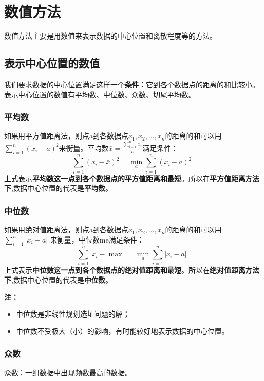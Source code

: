\documentclass[lang=cn,10pt]{elegantbook}
\begin{document}
\section{数值方法}
数值方法主要是用数值来表示数据的中心位置和离散程度等的方法。

\subsection{表示中心位置的数值}
我们要求数据的中心位置满足这样一个\textbf{条件：}它到各个数据点的距离的和比较小。
表示中心位置的数值有平均数、中位数、众数、切尾平均数。

\subsubsection{平均数}
如果用平方值距离法，则点a到各数据点$x_1,x_2,...,x_n$的距离的和可以用
$\sum_{i=1}^{n}(x_i-a)^2$来衡量。平均数$\bar{x} = \frac{\sum_{i=1}^{n}x_i}{n}$满足条件：
\begin{equation}
    \sum_{i=1}^n\left(x_i-\bar{x}\right)^2=\min_a\sum_{i=1}^n\left(x_i-a\right)^2
\end{equation}
上式表示\textbf{平均数这一点到各个数据点的平方值距离和最短}。所以在\textbf{平方值距离方法下},数据中心位置的代表是\textbf{平均数}。

\subsubsection{中位数}
如果用绝对值距离法，则点a到各数据点$x_1,x_2,...,x_n$的距离的和可以用$\sum_{i=1}^{n}|x_i-a|$
来衡量，中位数me满足条件：
\begin{equation}
    \sum_{i=1}^n|x_i-\max|=\min_a\sum_{i=1}^n|x_i-a|
\end{equation}
上式表示\textbf{中位数这一点到各个数据点的绝对值距离和最短}。所以在\textbf{绝对值距离方法下},数据中心位置的代表是\textbf{中位数}。

\textbf{注：}
\begin{itemize}
    \item 中位数是非线性规划选址问题的解；
    \item 中位数不受极大（小）的影响，有时能较好地表示数据的中心位置。
\end{itemize}

\subsubsection{众数}
众数：一组数据中出现频数最高的数据。
\end{document}
